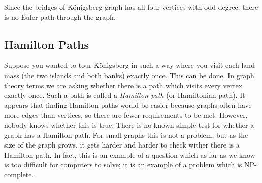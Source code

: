 \documentclass[12pt]{article}
\begin{document}
Since the bridges of K\"onigsberg graph has all four vertices with odd degree, there is no Euler path through the graph.

\subsection{Hamilton Paths}

Suppose you wanted to tour K\"onigsberg in such a way where you visit each land mass (the two islands and both banks) exactly once.  This can be done.  In graph theory terms we are asking whether there is a path which visits every vertex exactly once.  Such a path is called a {\em Hamilton path} (or Hamiltonian path).  It appears that finding Hamilton paths would be easier because graphs often have more edges than vertices, so there are fewer requirements to be met.  However, nobody knows whether this is true.  There is no known simple test for whether a graph has a Hamilton path.  For small graphs this is not a problem, but as the size of the graph grows, it gets harder and harder to check wither there is a Hamilton path.  In fact, this is an example of a question which as far as we know is too difficult for computers to solve; it is an example of a problem which is NP-complete.  
\end{document}

